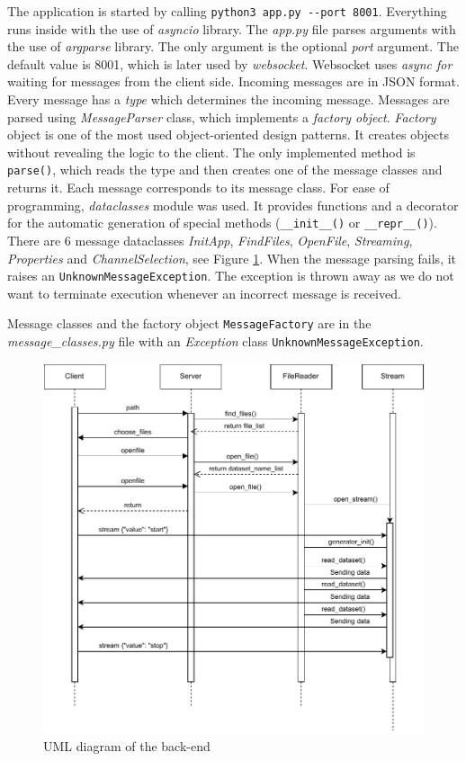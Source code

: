 The application is started by calling \verb|python3 app.py --port 8001|. Everything runs inside with the use of \textit{asyncio} library. The \textit{app.py} file parses arguments with the use of \textit{argparse} library. The only argument is the optional \textit{port} argument. The default value is 8001, which is later used by \textit{websocket}. Websocket uses \textit{async for} waiting for messages from the client side. Incoming messages are in JSON format. Every message has a \textit{type} which determines the incoming message. Messages are parsed using \textit{MessageParser} class, which implements a \textit{factory object}.
\textit{Factory} object is one of the most used object-oriented design patterns. It creates objects without revealing the logic to the client. The only implemented method is \verb|parse()|, which reads the type and then creates one of the message classes and returns it. Each message corresponds to its message class. For ease of programming, \textit{dataclasses} module was used. It provides functions and a decorator for the automatic generation of special methods (\verb|__init__()| or \verb|__repr__()|). There are 6 message dataclasses \textit{InitApp}, \textit{FindFiles}, \textit{OpenFile}, \textit{Streaming}, \textit{Properties} and \textit{ChannelSelection}, see Figure \ref{fig:uml}. When the message parsing fails, it raises an \verb|UnknownMessageException|. The exception is thrown away as we do not want to terminate execution whenever an incorrect message is received.

Message classes and the factory object \verb|MessageFactory| are in the \textit{message\_classes.py} file with an \textit{Exception} class \verb|UnknownMessageException|.

\begin{figure}
    \centering
    \includegraphics{pdf/websocketcomm.drawio.pdf}
    \caption{UML diagram of the back-end}
    \label{fig:uml}
\end{figure}

